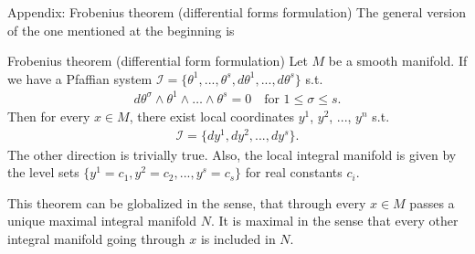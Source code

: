 \documentclass[
	english,%
	logo=false,%
	eurofusion=false, %
	titlegraphic=true, %
	]{ippbeamer}
\begin{document}
\begin{frame}{Appendix: Frobenius theorem (differential forms formulation)}
	\small
	The general version of the one mentioned at the beginning is
	\begin{alertblock}{\small Frobenius theorem (differential form formulation)}
		Let $M$ be a smooth manifold.
		If we have a Pfaffian system $\mathcal{I} = \{ \theta^1, ..., \theta^s, d\theta^1, ..., d\theta^s \}$
		s.t. 
		\begin{align*}
			d\theta^\sigma \wedge \theta^1 \wedge \dots \wedge \theta^s = 0 
				\quad \text{for }1\leq \sigma \leq s.
		\end{align*}
		Then for every $x \in M$, there exist local coordinates $y^1$, $y^2$, ..., $y^n$ 
		s.t.
		\begin{align*}
			\mathcal{I} = \{ dy^1, dy^2, ..., dy^s \}.
		\end{align*}
		The other direction is trivially true.
		Also, the local integral manifold is given by the level sets 
		$\{ y^1 = c_1 , y^2 = c_2, ..., y^s = c_s \}$ for real constants 
		$c_i$.
	\end{alertblock}
	This theorem can be globalized in the sense, that through every $x \in M$ passes a unique
	maximal integral manifold $N$. It is maximal in the sense that every other integral manifold
	going through $x$ is included in $N$.
\end{frame}
\end{document}
